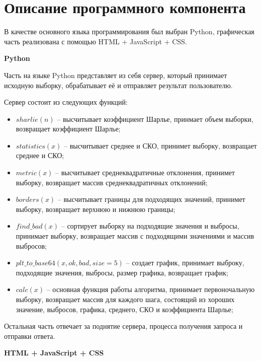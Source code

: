 \documentclass[a4paper,14pt]{article}
\begin{document}
\section{Описание программного компонента}

В качестве основного языка программирования был выбран Python, графическая часть реализована с помощью HTML + JavaScript + CSS.

\textbf{Python}

Часть на языке Python представляет из себя сервер, который принимает исходную выборку, обрабатывает её и отправляет результат пользователю.

Сервер состоит из следующих функций:

\begin{itemize}
	\item $sharlie(n)$ -- высчитывает коэффициент Шарлье, принмает объем выборки, возвращает коэффициент Шарлье;
	
	\item $statistics(x)$ -- высчитывает среднее и СКО, принимет выборку, возвращает среднее и СКО;
	
	\item $metric(x)$ -- высчитывает среднеквадратичные отклонения, принимет выборку, возвращает массив среднеквадратичных отклонений;
	
	\item $borders(x)$ -- высчитывает границы для подходящих значений, принимет выборку, возвращает верхнюю и нижнюю границы;
	
	\item $find\_bad(x)$ -- сортирует выборку на подходящие значения и выбросы, принимает выборку, возвращает массив с подходящими значениями и массив выбросов;
	
	\item $plt\_to\_base64(x, ok, bad, size=5)$ -- создает график, принимает выброку, подходящие значения, выбросы, размер графика, возвращает график;
	
	\item $calc(x)$ -- основная функция работы алгоритма, принимает первоночальную выборку, возвращает массив для каждого шага, состоящий из хороших значение, выбросов, графика, среднего, СКО и коэффициента Шарлье;
	
\end{itemize}

	Остальная часть отвечает за поднятие сервера, процесса получения запроса и отправки ответа.
	
\textbf{HTML + JavaScript + CSS}
\end{document}
